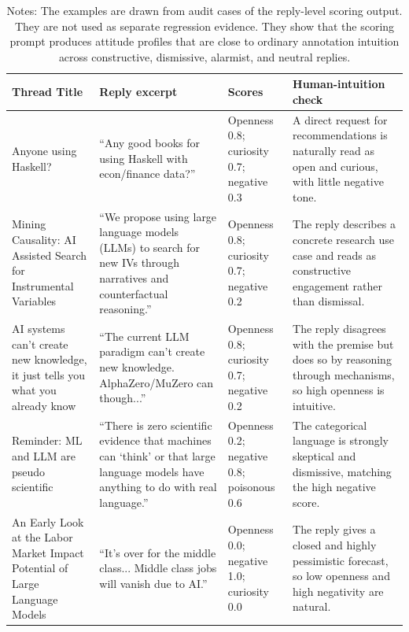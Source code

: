 \documentclass[11pt]{article}
\begin{document}
\begin{table}[H]
    \centering
    \caption{Illustrative Reply-Level Scoring Checks}
    \label{tab:scoring_audit_cases}
    \scriptsize
    \setlength{\tabcolsep}{3pt}
    \renewcommand{\arraystretch}{1.08}
    \begin{tabularx}{\textwidth}{p{} X p{} p{}}
        \toprule
        Thread Title & Reply excerpt & Scores & Human-intuition check \\
        \midrule
        Anyone using Haskell? &
        ``Any good books for using Haskell with econ/finance data?'' &
        Openness 0.8; curiosity 0.7; negative 0.3 &
        A direct request for recommendations is naturally read as open and curious, with little negative tone. \\
        Mining Causality: AI Assisted Search for Instrumental Variables &
        ``We propose using large language models (LLMs) to search for new IVs through narratives and counterfactual reasoning.'' &
        Openness 0.8; curiosity 0.7; negative 0.2 &
        The reply describes a concrete research use case and reads as constructive engagement rather than dismissal. \\
        AI systems can't create new knowledge, it just tells you what you already know &
        ``The current LLM paradigm can't create new knowledge. AlphaZero/MuZero can though...'' &
        Openness 0.8; curiosity 0.7; negative 0.2 &
        The reply disagrees with the premise but does so by reasoning through mechanisms, so high openness is intuitive. \\
        Reminder: ML and LLM are pseudo scientific &
        ``There is zero scientific evidence that machines can `think' or that large language models have anything to do with real language.'' &
        Openness 0.2; negative 0.8; poisonous 0.6 &
        The categorical language is strongly skeptical and dismissive, matching the high negative score. \\
        An Early Look at the Labor Market Impact Potential of Large Language Models &
        ``It's over for the middle class... Middle class jobs will vanish due to AI.'' &
        Openness 0.0; negative 1.0; curiosity 0.0 &
        The reply gives a closed and highly pessimistic forecast, so low openness and high negativity are natural. \\
        \bottomrule
    \end{tabularx}
{\captionsetup{justification=raggedright,singlelinecheck=false}
\caption*{\footnotesize Notes: The examples are drawn from audit cases of the reply-level scoring output. They are not used as separate regression evidence. They show that the scoring prompt produces attitude profiles that are close to ordinary annotation intuition across constructive, dismissive, alarmist, and neutral replies.}}
\end{table}
\end{document}
